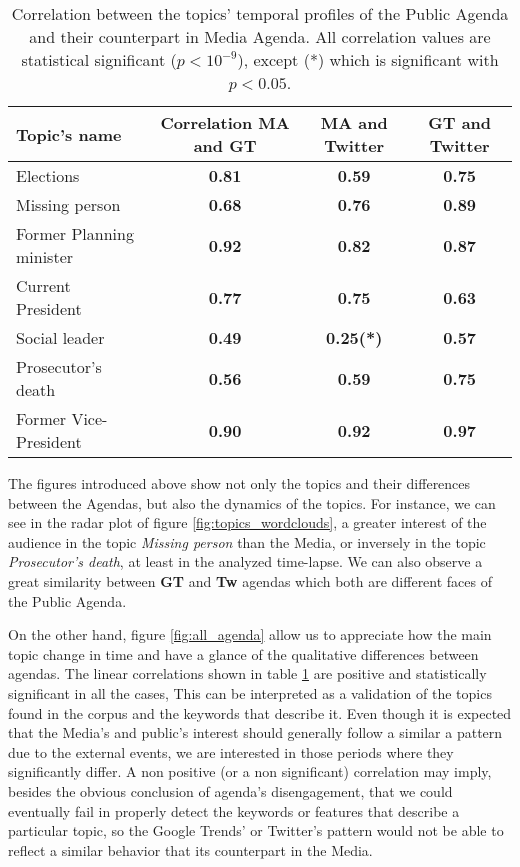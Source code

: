 \documentclass[10pt,letterpaper]{article}
\begin{document}
\begin{table}[!h]
\begin{adjustwidth}{-2.25in}{0in}
\begin{tabular}{lccc}
Topic's name & Correlation MA and GT & MA and Twitter & GT and Twitter \\ \hline
Elections & \textbf{0.81} & \textbf{0.59} & \textbf{0.75} \\
Missing person & \textbf{0.68} & \textbf{0.76} & \textbf{0.89} \\
Former Planning minister & \textbf{0.92} & \textbf{0.82} & \textbf{0.87} \\
Current President & \textbf{0.77} & \textbf{0.75} & \textbf{0.63} \\
Social leader & \textbf{0.49} & \textbf{0.25(*)} & \textbf{0.57} \\
Prosecutor's death & \textbf{0.56} & \textbf{0.59} & \textbf{0.75} \\
Former Vice-President & \textbf{0.90} & \textbf{0.92} & \textbf{0.97}\\
\end{tabular}
\caption{Correlation between the topics' temporal profiles of the Public Agenda and their counterpart in Media Agenda.
All correlation values are statistical significant ($p < 10^{-9}$), except (*) which is significant with $p < 0.05$.}
\label{table:gt_all_correlation}
\end{adjustwidth}
\end{table}


\par The figures introduced above show not only the topics and their differences between the Agendas, but also the dynamics of the topics.  For instance, we can see in the radar plot of figure \ref{fig:topics_wordclouds}, a greater interest of the audience in the topic \emph{Missing person} than the Media, or inversely in the topic \emph{Prosecutor's death}, at least in the analyzed time-lapse. 
We can also observe a great similarity between \textbf{GT} and \textbf{Tw} agendas which both are different faces of the Public Agenda.

\par On the other hand, figure \ref{fig:all_agenda} allow us to appreciate how the main topic change in time and have a glance of the qualitative differences between agendas.
The linear correlations shown in table \ref{table:gt_all_correlation} are  positive and statistically significant in all the cases, This can be interpreted as a validation of the topics found in the corpus and the keywords that describe it. 
Even though it is expected that the Media's and public's interest should generally follow a similar a pattern due to the external events, we are interested in those periods where they significantly differ. 
A non positive (or a non significant) correlation may imply, besides the obvious conclusion of agenda's disengagement, that we could eventually fail in properly detect the keywords or features that describe a particular topic, so the Google Trends' or Twitter's pattern would not be able to reflect a similar behavior that its counterpart in the Media.
\end{document}
